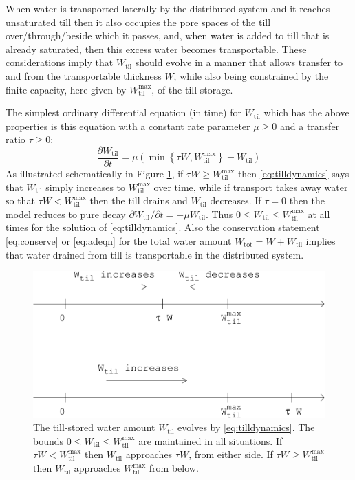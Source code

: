 \documentclass[11pt,final]{amsart}
\newcommand{\Wtil}{W_{\text{til}}}
\newcommand{\Wtilmax}{W_{\text{til}}^{\text{max}}}
\newcommand{\Wtot}{W_{\text{tot}}}
\begin{document}
When water is transported laterally by the distributed system and it reaches unsaturated till then it also occupies the pore spaces of the till over/through/beside which it passes, and, when water is added to till that is already saturated, then this excess water becomes transportable.  These considerations imply that $\Wtil$ should evolve in a manner that allows transfer to and from the transportable thickness $W$, while also being constrained by the finite capacity, here given by $\Wtilmax$, of the till storage.

The simplest ordinary differential equation (in time) for $\Wtil$ which has the above properties is this equation with a constant rate parameter $\mu\ge 0$ and a transfer ratio $\tau\ge 0$:
\begin{equation}
\frac{\partial \Wtil}{\partial t} = \mu \left(\min\left\{\tau W,\Wtilmax\right\} - \Wtil\right) \label{eq:tilldynamics}
\end{equation}
As illustrated schematically in Figure \ref{fig:tillschema}, if $\tau W \ge \Wtilmax$ then \eqref{eq:tilldynamics} says that $\Wtil$ simply increases to $\Wtilmax$ over time, while if transport takes away water so that $\tau W < \Wtilmax$ then the till drains and $\Wtil$ decreases.  If $\tau=0$ then the model reduces to pure decay $\partial \Wtil/\partial t = - \mu \Wtil$.  Thus $0\le \Wtil \le \Wtilmax$ at all times for the solution of \eqref{eq:tilldynamics}.  Also the conservation statement \eqref{eq:conserve} or \eqref{eq:adeqn} for the total water amount $\Wtot=W+\Wtil$ implies that water drained from till is transportable in the distributed system.

\begin{figure}[ht]
\bigskip
\includegraphics[width=4.5in,keepaspectratio=true]{tillschema}
\bigskip
\caption{The till-stored water amount $\Wtil$ evolves by \eqref{eq:tilldynamics}.  The bounds $0\le \Wtil \le \Wtilmax$ are maintained in all situations.  If $\tau W < \Wtilmax$ then $\Wtil$ approaches $\tau W$, from either side.  If $\tau W \ge \Wtilmax$ then $\Wtil$ approaches $\Wtilmax$ from below.}
\label{fig:tillschema}
\end{figure}
\end{document}
